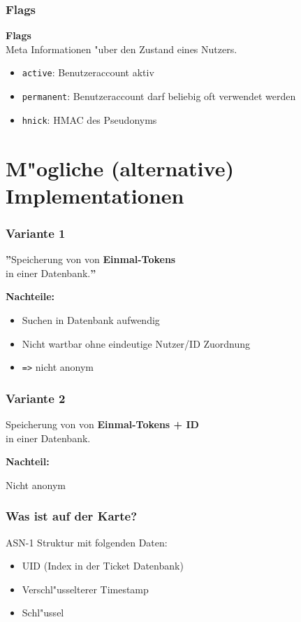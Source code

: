 %
%

\begin{frame}
	\frametitle{Flags}
	\vspace{1cm}

	\textbf{Flags}
	\\
	Meta Informationen "uber den Zustand eines Nutzers.
	\begin{itemize}
		\item \texttt{active}: Benutzeraccount aktiv
		\item \texttt{permanent}: Benutzeraccount darf beliebig oft verwendet werden
		\item \texttt{hnick}: HMAC des Pseudonyms
	\end{itemize}
\end{frame}

\section{M"ogliche (alternative) Implementationen}
\begin{frame}
	\frametitle{Variante 1}
	\textbf{''}Speicherung von von \textbf{Einmal-Tokens}\\
	in einer Datenbank.\textbf{''}

	\vspace{1cm}\par

	\textbf{Nachteile:}
	\begin{itemize}
		\item<2-> Suchen in Datenbank aufwendig
		\item<3-> Nicht wartbar ohne eindeutige Nutzer/ID Zuordnung
		\item<4-> \texttt{=>} nicht anonym
	\end{itemize}
\end{frame}

\begin{frame}
	\frametitle{Variante 2}
	Speicherung von von \textbf{Einmal-Tokens + ID}\\
	in einer Datenbank.

	\vspace{1cm}

	\textbf{Nachteil:}
	\par Nicht anonym
\end{frame}

\begin{frame}
	\frametitle {Was ist auf der Karte?}
	
	ASN-1 Struktur mit folgenden Daten:
	\begin{itemize}
		\item<2-> UID (Index in der Ticket Datenbank)
		\item<3-> Verschl"usselterer Timestamp
		\item<4-> Schl"ussel 
	\end{itemize}
\end{frame}

